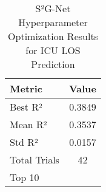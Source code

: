 
\begin{table}[h!]
\centering
\caption{S²G-Net Hyperparameter Optimization Results for ICU LOS Prediction}
\label{tab:hyperparam_results}
\begin{tabular}{lc}
\toprule
\textbf{Metric} & \textbf{Value} \\
\midrule
Best R² & 0.3849 \\
Mean R² & 0.3537 \\
Std R² & 0.0157 \\
Total Trials & 42 \\
Top 10%
\bottomrule
\end{tabular}
\end{table}

